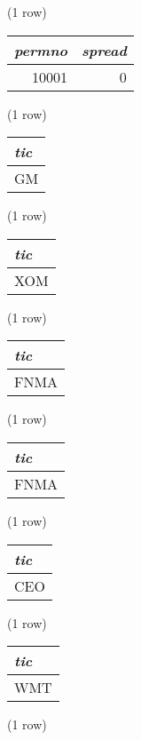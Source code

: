 \noindent (1 row) \\

\begin{tabular}{r | r}
\textit{permno} & \textit{spread} \\
\hline
10001 & 0 \\
\end{tabular}

\noindent (1 row) \\

\begin{tabular}{l}
\textit{tic} \\
\hline
GM \\
\end{tabular}

\noindent (1 row) \\

\begin{tabular}{l}
\textit{tic} \\
\hline
XOM \\
\end{tabular}

\noindent (1 row) \\

\begin{tabular}{l}
\textit{tic} \\
\hline
FNMA \\
\end{tabular}

\noindent (1 row) \\

\begin{tabular}{l}
\textit{tic} \\
\hline
FNMA \\
\end{tabular}

\noindent (1 row) \\

\begin{tabular}{l}
\textit{tic} \\
\hline
CEO \\
\end{tabular}

\noindent (1 row) \\

\begin{tabular}{l}
\textit{tic} \\
\hline
WMT \\
\end{tabular}

\noindent (1 row) \\

